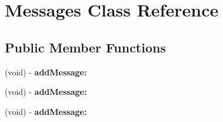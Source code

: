 \hypertarget{interface_messages}{
\section{Messages Class Reference}
\label{interface_messages}
}
\subsection*{Public Member Functions}
\begin{DoxyCompactItemize}
\item 
\hypertarget{interface_messages_a09368272067bb5eaf5ecd305c68288d1}{
(void) -\/ {\bfseries addMessage:}}
\label{interface_messages_a09368272067bb5eaf5ecd305c68288d1}

\item 
\hypertarget{interface_messages_a09368272067bb5eaf5ecd305c68288d1}{
(void) -\/ {\bfseries addMessage:}}
\label{interface_messages_a09368272067bb5eaf5ecd305c68288d1}

\item 
\hypertarget{interface_messages_a09368272067bb5eaf5ecd305c68288d1}{
(void) -\/ {\bfseries addMessage:}}
\label{interface_messages_a09368272067bb5eaf5ecd305c68288d1}

\end{DoxyCompactItemize}
